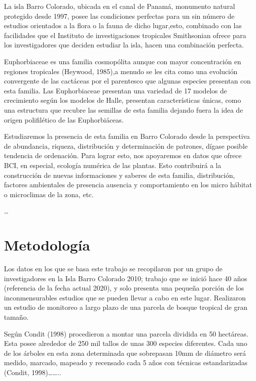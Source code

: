 \documentclass[11pt,]{article}
\begin{document}
La isla Barro Colorado, ubicada en el canal de Panamá, monumento natural
protegido desde 1997, posee las condiciones perfectas para un sin número
de estudios orientados a la flora o la fauna de dicho lugar,esto,
combinado con las facilidades que el Instituto de investigaciones
tropicales Smithsonian ofrece para los investigadores que deciden
estudiar la isla, hacen una combinación perfecta.

Euphorbiaceae es una familia cosmopólita aunque con mayor concentración
en regiones tropicales (Heywood, 1985),a menudo se les cita como una
evolución convergente de las cactáceas por el parentesco que algunas
especies presentan con esta familia. Las Euphorbiaceae presentan una
variedad de 17 modelos de crecimiento según los modelos de Halle,
presentan características únicas, como una estructura que recubre las
semillas de esta familia dejando fuera la idea de origen polifilético de
las Euphorbiáceas.

Estudiaremos la presencia de esta familia en Barro Colorado desde la
perspectiva de abundancia, riqueza, distribución y determinación de
patrones, dígase posible tendencia de ordenación. Para lograr esto, nos
apoyaremos en datos que ofrece BCI, en especial, ecología numérica de
las plantas. Esto contribuirá a la construcción de nuevas informaciones
y saberes de esta familia, distribución, factores ambientales de
presencia ausencia y comportamiento en los micro hábitat o microclimas
de la zona, etc.

\ldots

\section{Metodología}\label{metodologuxeda}

Los datos en los que se basa este trabajo se recopilaron por un grupo de
investigadores en la Isla Barro Colorado 2010; trabajo que se inició
hace 40 años (referencia de la fecha actual 2020), y solo presenta una
pequeña porción de los inconmensurables estudios que se pueden llevar a
cabo en este lugar. Realizaron un estudio de monitoreo a largo plazo de
una parcela de bosque tropical de gran tamaño.

Según Condit (1998) procedieron a montar una parcela dividida en 50
hectáreas. Esta posee alrededor de 250 mil tallos de unas 300 especies
diferentes. Cada uno de los árboles en esta zona determinada que
sobrepasan 10mm de diámetro será medido, marcado, mapeado y recensado
cada 5 años con técnicas estandarizadas (Condit, 1998)\ldots{}\ldots{}..
\end{document}
